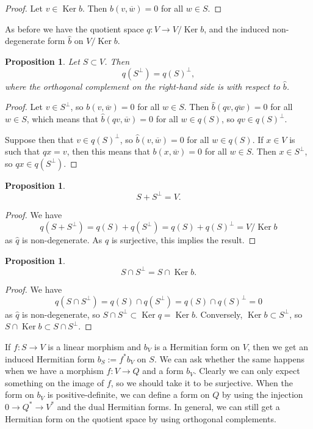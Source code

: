 \documentclass[10pt,a4paper]{amsart}
\newtheorem{prop}[theo]{Proposition}
\theoremstyle{definition}
\def\ov#1{\overline{#1}}
\DeclareMathOperator{\Ker}{Ker}
\begin{document}
\begin{proof}
Let $v \in \Ker b$. Then $b(v, \ov w) = 0$ for all $w \in S$.
\end{proof}


As before we have the quotient space $q : V \to V / \Ker b$, and the induced non-degenerate form $\hat b$ on $V / \Ker b$.

\begin{prop}
Let $S \subset V$. Then
\[
q(S^\perp) = q(S)^\perp,
\]
where the orthogonal complement on the right-hand side is with respect to $\hat b$.
\end{prop}

\begin{proof}
Let $v \in S^\perp$, so $b(v, \ov w) = 0$ for all $w \in S$. Then $\hat b(qv, \ov{qw}) = 0$ for all $w \in S$, which means that $\hat b(qv, \ov w) = 0$ for all $w \in q(S)$, so $qv \in q(S)^\perp$.

Suppose then that $v \in q(S)^\perp$, so $\hat b(v, \ov w) = 0$ for all $w \in q(S)$. If $x \in V$ is such that $qx = v$, then this means that $b(x, \ov w) = 0$ for all $w \in S$. Then $x \in S^\perp$, so $qx \in q(S^\perp)$.
\end{proof}



\begin{prop}
\[
S + S^\perp = V.
\]
\end{prop}

\begin{proof}
We have
\[
q(S + S^\perp)
= q(S) + q(S^\perp)
= q(S) + q(S)^\perp
= V / \Ker b
\]
as $\hat q$ is non-degenerate. As $q$ is surjective, this implies the result.
\end{proof}




\begin{prop}
\[
S \cap S^\perp = S \cap \Ker b.
\]
\end{prop}

\begin{proof}
We have
\[
q(S \cap S^\perp)
= q(S) \cap q(S^\perp)
= q(S) \cap q(S)^\perp
= 0
\]
as $\hat q$ is non-degenerate,
so $S \cap S^\perp \subset \Ker q = \Ker b$. Conversely, $\Ker b \subset S^\perp$, so $S \cap \Ker b \subset S \cap S^\perp$.
\end{proof}


If $f : S \to V$ is a linear morphism and $b_V$ is a Hermitian form on $V$, then
we get an induced Hermitian form $b_S := f^*b_V$ on $S$. We can ask whether the
same happens when we have a morphism $f : V \to Q$ and a form $b_V$. Clearly we
can only expect something on the image of $f$, so we should take it to be
surjective. When the form on $b_V$ is positive-definite, we can define a form on
$Q$ by using the injection $0 \to Q^* \to V^*$ and the dual Hermitian forms. In
general, we can still get a Hermitian form on the quotient space by using
orthogonal complements.
\end{document}
